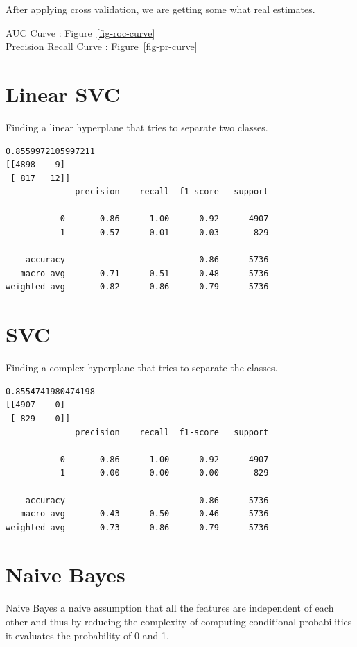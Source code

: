 \documentclass[
  letterpaper,
  DIV=11,
  numbers=noendperiod]{scrartcl}
\begin{document}
After applying cross validation, we are getting some what real
estimates.

AUC Curve : Figure~\ref{fig-roc-curve}\\
Precision Recall Curve : Figure~\ref{fig-pr-curve}

\hypertarget{linear-svc}{%
\section{Linear SVC}\label{linear-svc}}

Finding a linear hyperplane that tries to separate two classes.

\begin{verbatim}
0.8559972105997211
[[4898    9]
 [ 817   12]]
              precision    recall  f1-score   support

           0       0.86      1.00      0.92      4907
           1       0.57      0.01      0.03       829

    accuracy                           0.86      5736
   macro avg       0.71      0.51      0.48      5736
weighted avg       0.82      0.86      0.79      5736
\end{verbatim}

\hypertarget{svc}{%
\section{SVC}\label{svc}}

Finding a complex hyperplane that tries to separate the classes.

\begin{verbatim}
0.8554741980474198
[[4907    0]
 [ 829    0]]
              precision    recall  f1-score   support

           0       0.86      1.00      0.92      4907
           1       0.00      0.00      0.00       829

    accuracy                           0.86      5736
   macro avg       0.43      0.50      0.46      5736
weighted avg       0.73      0.86      0.79      5736
\end{verbatim}

\hypertarget{naive-bayes}{%
\section{Naive Bayes}\label{naive-bayes}}

Naive Bayes a naive assumption that all the features are independent of
each other and thus by reducing the complexity of computing conditional
probabilities it evaluates the probability of 0 and 1.
\end{document}

